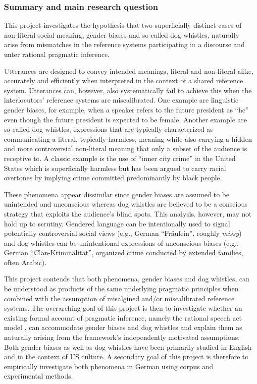 \documentclass[11pt]{article}
\begin{document}
\subsubsection{Summary and main research question}

This project investigates the hypothesis that two superficially distinct cases of non-literal social meaning, gender biases and so-called dog whistles, naturally arise from mismatches in the reference systems participating in a discourse and unter rational pragmatic inference.

Utterances are designed to convey intended meanings, literal and non-literal alike, accurately and efficiently when interpreted in the context of a shared reference system.  Utterances can, however, also systematically fail to achieve this when the interlocutors’ reference systems are miscalibrated.  One example are linguistic gender biases, for example, when a speaker refers to the future president as “he” even though the future president is expected to be female.  Another example are so-called dog whistles, expressions that are typically characterized as communicating a literal, typically harmless, meaning while also carrying a hidden and more controversial non-literal meaning that only a subset of the audience is receptive to.  A classic example is the use of “inner city crime” in the United States which is superficially harmless but has been argued to carry racial overtones by implying crime committed predominantly by black people.

These phenomena appear dissimilar since gender biases are assumed to be unintended and unconscious whereas dog whistles are believed to be a conscious strategy that exploits the audience’s blind spots.  This analysis, however, may not hold up to scrutiny.  Gendered language can be intentionally used to signal potentially controversial social views (e.g., German “Fräulein”, roughly \textit{missy}) and dog whistles can be unintentional expressions of unconscious biases (e.g., German “Clan-Kriminalität”, organized crime conducted by extended families, often Arabic).

This project contends that both phenomena, gender biases and dog whistles, can be understood as products of the same underlying pragmatic principles when combined with the assumption of misalgined and/or miscalibrated reference systems.  The overarching goal of this project is then to investigate whether an existing formal account of pragmatic inference, namely the rational speech act model \parencite[RSA model,][]{GoodmanStuhlmueller2013}, can accommodate gender biases and dog whistles and explain them as naturally arising from the framework’s independently motivated assumptions.  Both gender biases as well as dog whistles have been primarily studied in English and in the context of US culture.  A secondary goal of this project is therefore to empirically investigate both phenomena in German using corpus and experimental methods.
\end{document}
